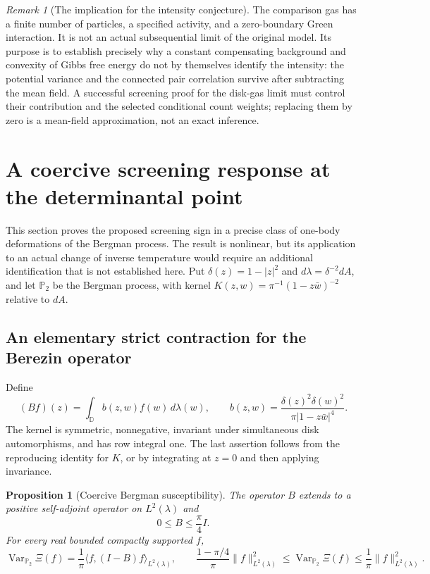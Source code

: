 \documentclass[11pt,a4paper]{article}
\numberwithin{equation}{section}
\newtheorem{proposition}[theorem]{Proposition}
\theoremstyle{definition}
\theoremstyle{remark}
\newtheorem{remark}[theorem]{Remark}
\newcommand{\D}{\mathbb D}
\begin{document}
\begin{remark}[The implication for the intensity conjecture]
The comparison gas has a finite number of particles, a specified
activity, and a zero-boundary Green interaction.  It is not an actual
subsequential limit of the original model.  Its purpose is to establish
precisely why a constant compensating background and convexity of Gibbs
free energy do not by themselves identify the intensity: the potential
variance and the connected pair correlation survive after subtracting
the mean field.  A successful screening proof for the disk-gas limit
must control their contribution and the selected conditional count
weights; replacing them by zero is a mean-field approximation, not an
exact inference.
\end{remark}


\section{A coercive screening response at the determinantal point}
\label{sec:screening-berezin-response}

This section proves the proposed screening sign in a precise class of
one-body deformations of the Bergman process.  The result is nonlinear,
but its application to an actual change of inverse temperature would
require an additional identification that is not established here.
Put $\delta(z)=1-|z|^2$ and $d\lambda=\delta^{-2}dA$, and let
$\mathbb P_2$ be the Bergman process, with kernel
$K(z,w)=\pi^{-1}(1-z\bar w)^{-2}$ relative to $dA$.

\subsection{An elementary strict contraction for the Berezin operator}

Define
\[
 (Bf)(z)=\int_\D b(z,w)f(w)\,d\lambda(w),\qquad
 b(z,w)=\frac{\delta(z)^2\delta(w)^2}{\pi|1-z\bar w|^4}.
\]
The kernel is symmetric, nonnegative, invariant under simultaneous disk
automorphisms, and has row integral one.  The last assertion follows
from the reproducing identity for $K$, or by integrating at $z=0$ and
then applying invariance.

\begin{proposition}[Coercive Bergman susceptibility]
\label{prop:screening-berezin-coercivity}
The operator $B$ extends to a positive self-adjoint operator on
$L^2(\lambda)$ and
\begin{equation}
 0\le B\le \frac\pi4 I.
 \label{eq:screening-berezin-contraction}
\end{equation}
For every real bounded compactly supported $f$,
\begin{equation}
 \operatorname{Var}_{\mathbb P_2}\Xi(f)
  =\frac1\pi\langle f,(I-B)f\rangle_{L^2(\lambda)},\qquad
 \frac{1-\pi/4}{\pi}\|f\|_{L^2(\lambda)}^2
 \le\operatorname{Var}_{\mathbb P_2}\Xi(f)
 \le\frac1\pi\|f\|_{L^2(\lambda)}^2.
 \label{eq:screening-berezin-variance}
\end{equation}
\end{proposition}
\end{document}
